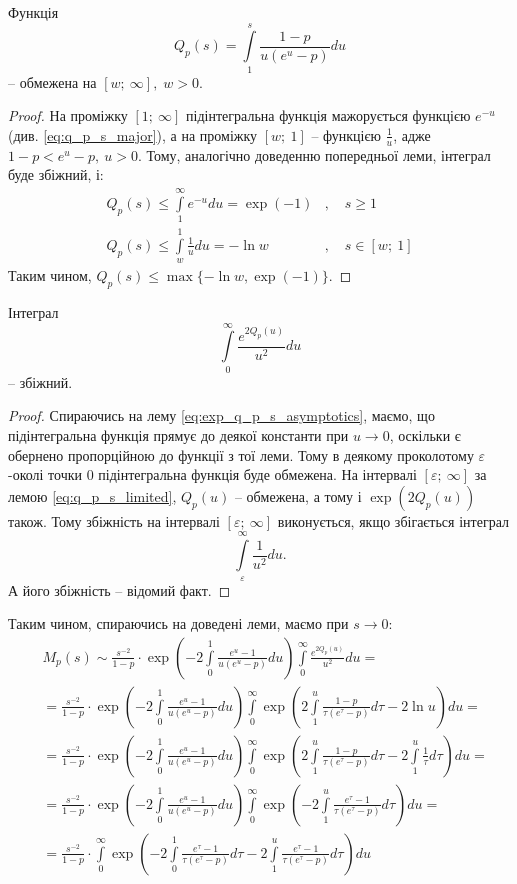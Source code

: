 \begin{lem}
	\label{eq:q_p_s_limited}
	Функція
	$$
	Q_p(s) = \int\limits_1^s \frac{1- p}{u(e^u - p)} du
	$$
	– обмежена на $[w; ~\infty], \; w>0$.
\end{lem}
\begin{proof}
	На проміжку $[1; ~\infty]$ підінтегральна функція мажорується функцією $e^{-u}$ (див. \eqref{eq:q_p_s_major}), а на проміжку $[w; ~1]$ – функцією $\frac{1}{u}$, адже $1- p < e^u - p, ~ u > 0$. Тому, аналогічно доведенню попередньої леми, інтеграл буде збіжний, і:
	\begin{align*}
	Q_p(s) \leq \int\limits_1^\infty e^{-u} du = \exp(-1) &,\quad s \geq 1 \\
	Q_p(s) \leq \int\limits_w^1 \frac{1}{u} du = - \ln w &, \quad s \in [w;~1]
	\end{align*}
	Таким чином, $Q_p(s) \leq \max\{-\ln w, \exp(-1)\}$.
\end{proof}

\begin{lem}
	Інтеграл
	$$
	\int\limits_0^\infty \frac{e^{2Q_p(u)}}{u^2} du
	$$
	– збіжний.
\end{lem}
\begin{proof}
	Спираючись на лему \eqref{eq:exp_q_p_s_asymptotics}, маємо, що підінтегральна функція прямує до деякої константи при $u \rightarrow 0$, оскільки є обернено пропорційною до функції з тої леми. Тому в деякому проколотому $\varepsilon$-околі точки 0 підінтегральна функція буде обмежена. На інтервалі $[\varepsilon; ~\infty]$ за лемою \eqref{eq:q_p_s_limited}, $Q_p(u)$ – обмежена, а тому і $\exp(2Q_p(u))$ також. Тому збіжність на інтервалі $[\varepsilon; ~\infty]$ виконується, якщо збігається інтеграл
	\[
	\int\limits_\varepsilon^\infty \frac{1}{u^2} du.
	\]
	А його збіжність – відомий факт.
\end{proof}

Таким чином, спираючись на доведені леми, маємо при $s \rightarrow 0$:
\begin{align*}
&M_p(s) \sim \frac{s^{-2}}{1-p} \cdot \exp\left(-2\int\limits_0^1 \frac{e^u  - 1}{u(e^u - p)} du\right) \int\limits_0^\infty \frac{e^{2Q_p(u)}}{u^2} du = \\
& = \frac{s^{-2}}{1-p} \cdot \exp\left(-2\int\limits_0^1 \frac{e^u  - 1}{u(e^u - p)} du\right) \int\limits_0^\infty \exp\left(2\int\limits_1^u \frac{1- p}{\tau(e^\tau - p)} d\tau - 2 \ln u\right) du = \\
& = \frac{s^{-2}}{1-p} \cdot \exp\left(-2\int\limits_0^1 \frac{e^u  - 1}{u(e^u - p)} du\right) \int\limits_0^\infty \exp\left(2\int\limits_1^u \frac{1- p}{\tau(e^\tau - p)} d\tau - 2  \int\limits_1^u  \frac{1}{\tau} d\tau \right) du = \\
& = \frac{s^{-2}}{1-p} \cdot \exp\left(-2\int\limits_0^1 \frac{e^u  - 1}{u(e^u - p)} du\right) \int\limits_0^\infty \exp\left(-2\int\limits_1^u \frac{e^{\tau} - 1}{\tau(e^\tau - p)} d\tau  \right) du = \\
& = \frac{s^{-2}}{1-p} \cdot \int\limits_0^\infty \exp\left( -2\int\limits_0^1 \frac{e^{\tau} - 1}{\tau(e^\tau - p)} d\tau -2\int\limits_1^u \frac{e^{\tau} - 1}{\tau(e^\tau - p)} d\tau  \right) du 
\end{align*}

